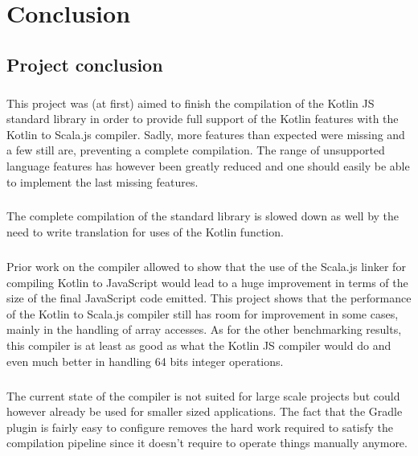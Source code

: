 
\chapter{Conclusion}
  \section{Project conclusion}
  \paragraph{} This project was (at first) aimed to finish the compilation of the Kotlin JS standard library in order to provide full support of the Kotlin features with the Kotlin to Scala.js compiler. Sadly, more features than expected were missing and a few still are, preventing a complete compilation. The range of unsupported language features has however been greatly reduced and one should easily be able to implement the last missing features.
  
  \paragraph{} The complete compilation of the standard library is slowed down as well by the need to write translation for uses of the Kotlin  function.
  
  \paragraph{} Prior work on the compiler allowed to show that the use of the Scala.js linker for compiling Kotlin to JavaScript would lead to a huge improvement in terms of the size of the final JavaScript code emitted. This project shows that the performance of the Kotlin to Scala.js compiler still has room for improvement in some cases, mainly in the handling of array accesses. As for the other benchmarking results, this compiler is at least as good as what the Kotlin JS compiler would do and even much better in handling 64 bits integer operations.
  
  \paragraph{} The current state of the compiler is not suited for large scale projects but could however already be used for smaller sized applications. The fact that the Gradle plugin is fairly easy to configure removes the hard work required to satisfy the compilation pipeline since it doesn't require to operate things manually anymore.
  
